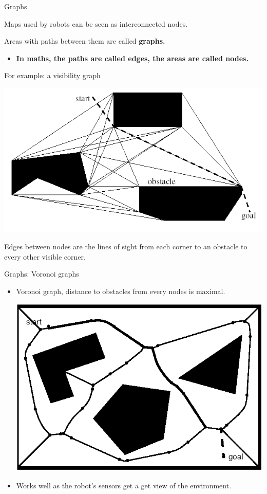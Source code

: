 \documentclass[compress]{beamer}
\begin{document}
\begin{frame}{Graphs}

Maps used by robots can be seen as interconnected nodes.

Areas with paths between them are called \textbf{graphs.}

\begin{itemize}
\item \textbf{In maths, the paths are called edges, the areas are called
  nodes.}
\end{itemize}

For example: a visibility graph

    \begin{center}
        \includegraphics[width=0.6\linewidth]{visibilitygraph}
    \end{center}

Edges between nodes are the lines of sight from each corner to an
obstacle to every other visible corner.

\end{frame}

\begin{frame}{Graphs: Voronoi graphs}

\begin{itemize}
\item Voronoi graph, distance to obstacles from every nodes is maximal.

    \begin{center}
        \includegraphics[width=0.8\linewidth]{voronoi}
    \end{center}

\item Works well as the robot's sensors get a get view of the environment.
\end{itemize}

\end{frame}
\end{document}

